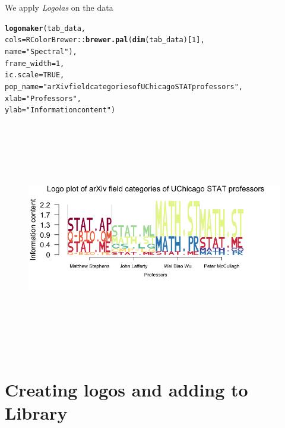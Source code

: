 \documentclass[12pt]{article}\usepackage[]{graphicx}\usepackage[usenames,dvipsnames]{color}
\makeatletter
\newcommand{\hlnum}[1]{\textcolor[rgb]{0.686,0.059,0.569}{#1}}%
\newcommand{\hlstr}[1]{\textcolor[rgb]{0.192,0.494,0.8}{#1}}%
\newcommand{\hlopt}[1]{\textcolor[rgb]{0,0,0}{#1}}%
\newcommand{\hlstd}[1]{\textcolor[rgb]{0.345,0.345,0.345}{#1}}%
\newcommand{\hlkwc}[1]{\textcolor[rgb]{0.333,0.667,0.333}{#1}}%
\newcommand{\hlkwd}[1]{\textcolor[rgb]{0.737,0.353,0.396}{\textbf{#1}}}%
\newenvironment{kframe}{%
 \def\at@end@of@kframe{}%
 \ifinner\ifhmode%
  \def\at@end@of@kframe{\end{minipage}}%
  \begin{minipage}{\columnwidth}%
 \fi\fi%
 \def\FrameCommand##1{\hskip\@totalleftmargin \hskip-\fboxsep
 \colorbox{shadecolor}{##1}\hskip-\fboxsep
     \hskip-\linewidth \hskip-\@totalleftmargin \hskip\columnwidth}%
 \MakeFramed {\advance\hsize-\width
   \@totalleftmargin\z@ \linewidth\hsize
   \@setminipage}}%
 {\par\unskip\endMakeFramed%
 \at@end@of@kframe}
\newenvironment{knitrout}{}{} %
\newcommand{\Logolas}{\textit{Logolas}}
\makeatother
\begin{document}
We apply \Logolas{} on the data

\begin{knitrout}
\color{fgcolor}\begin{kframe}
\begin{alltt}
\hlkwd{logomaker}\hlstd{(tab_data,}
          \hlkwc{cols}\hlstd{= RColorBrewer}\hlopt{::}\hlkwd{brewer.pal}\hlstd{(}\hlkwd{dim}\hlstd{(tab_data)[}\hlnum{1}\hlstd{],}
          \hlkwc{name} \hlstd{=} \hlstr{"Spectral"}\hlstd{),}
          \hlkwc{frame_width} \hlstd{=} \hlnum{1}\hlstd{,}
          \hlkwc{ic.scale} \hlstd{=} \hlnum{TRUE}\hlstd{,}
          \hlkwc{pop_name} \hlstd{=} \hlstr{"arXiv field categories of UChicago STAT professors"}\hlstd{,}
          \hlkwc{xlab} \hlstd{=} \hlstr{"Professors"}\hlstd{,}
          \hlkwc{ylab} \hlstd{=} \hlstr{"Information content"}\hlstd{)}
\end{alltt}
\end{kframe}
\end{knitrout}

\begin{figure}[htp]
\begin{center}
\includegraphics[width=7in,height=4in]{figures/logolas_arxiv_1.png}
\end{center}
\end{figure}

\section{Creating logos and adding to Library}
\end{document}
